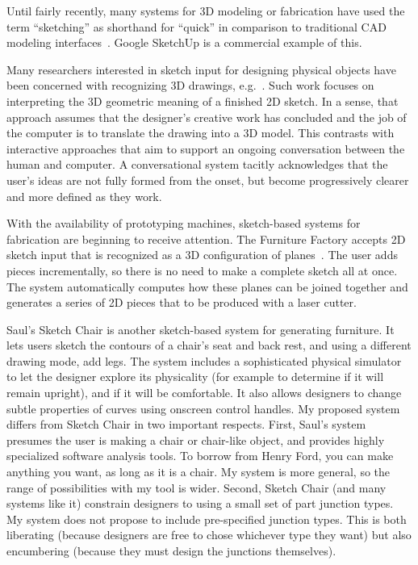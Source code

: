 \documentclass[11pt]{article}
\begin{document}
Until fairly recently, many systems for 3D modeling or fabrication
have used the term ``sketching'' as shorthand for ``quick'' in
comparison to traditional CAD modeling
interfaces~\cite{bloomenthal-sketch-n-make,pugh-thesis-viking,zeleznik-sketch}. Google
SketchUp is a commercial example of this.

Many researchers interested in sketch input for designing physical
objects have been concerned with recognizing 3D drawings,
e.g.~\cite{lipson-correlation,masry-3d-sketch}. Such work focuses on
interpreting the 3D geometric meaning of a finished 2D sketch. In a
sense, that approach assumes that the designer's creative work has
concluded and the job of the computer is to translate the drawing into
a 3D model. This contrasts with interactive approaches that aim to
support an ongoing conversation between the human and computer. A
conversational system tacitly acknowledges that the user's ideas are
not fully formed from the onset, but become progressively clearer and
more defined as they work.

With the availability of prototyping machines, sketch-based systems
for fabrication are beginning to receive attention. The Furniture
Factory accepts 2D sketch input that is recognized as a 3D
configuration of planes~\cite{oh-fab}. The user adds pieces
incrementally, so there is no need to make a complete sketch all at
once. The system automatically computes how these planes can be joined
together and generates a series of 2D pieces that to be produced with
a laser cutter.

Saul's Sketch Chair \cite{saul-sketch-chair} is another sketch-based
system for generating furniture. It lets users sketch the contours of
a chair's seat and back rest, and using a different drawing mode, add
legs. The system includes a sophisticated physical simulator to let
the designer explore its physicality (for example to determine if it
will remain upright), and if it will be comfortable. It also allows
designers to change subtle properties of curves using onscreen control
handles. My proposed system differs from Sketch Chair in two important
respects. First, Saul's system presumes the user is making a chair or
chair-like object, and provides highly specialized software analysis
tools. To borrow from Henry Ford, you can make anything you want, as
long as it is a chair. My system is more general, so the range of
possibilities with my tool is wider. Second, Sketch Chair (and many
systems like it) constrain designers to using a small set of part
junction types. My system does not propose to include pre-specified
junction types. This is both liberating (because designers are free to
chose whichever type they want) but also encumbering (because they
must design the junctions themselves).
\end{document}
